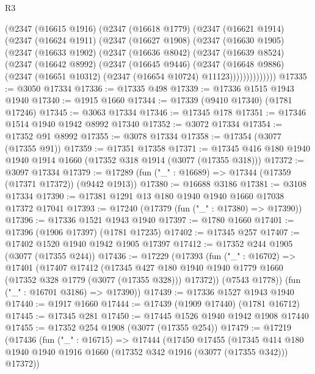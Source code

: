 \begin{lexlean}{R3}
\begin{coremodule}
    (@2347
      (@16615 @1916)
      (@2347
        (@16618 @1779)
        (@2347
          (@16621 @1914)
          (@2347
            (@16624 @1911)
            (@2347
              (@16627 @1908)
              (@2347
                (@16630 @1905)
                (@2347
                  (@16633 @1902)
                  (@2347
                    (@16636 @8042)
                    (@2347
                      (@16639 @8524)
                      (@2347
                        (@16642 @8992)
                        (@2347
                          (@16645 @9446)
                          (@2347
                            (@16648 @9886)
                            (@2347 (@16651 @10312) (@2347 (@16654 @10724) @11123))))))))))))))
@17335 := @3050 @17334
@17336 := @17335 @498
@17339 := @17336 @1515 @1943 @1940
@17340 := @1915 @1660
@17344 := @17339 (@9410 @17340) (@1781 @17246)
@17345 := @3063 @17334
@17346 := @17345 @178
@17351 := @17346 @1514 @1940 @1942 @8992 @17340
@17352 := @3072 @17334
@17354 := @17352 @91 @8992
@17355 := @3078 @17334
@17358 := @17354 (@3077 (@17355 @91))
@17359 := @17351 @17358
@17371 := @17345 @416 @180 @1940 @1940 @1914 @1660 (@17352 @318 @1914 (@3077 (@17355 @318)))
@17372 := @3097 @17334
@17379 := @17289 (fun ("_" : @16689) => @17344 (@17359 (@17371 @17372)) (@9442 @1913))
@17380 := @16688 @3186
@17381 := @3108 @17334
@17390 := @17381 @1291 @13 @180 @1940 @1940 @1660 @17038 @17372 @17041
@17393 := @17240 (@17379 (fun ("_" : @17380) => @17390))
@17396 := @17336 @1521 @1943 @1940
@17397 := @1780 @1660
@17401 := @17396 (@1906 @17397) (@1781 @17235)
@17402 := @17345 @257
@17407 := @17402 @1520 @1940 @1942 @1905 @17397
@17412 := @17352 @244 @1905 (@3077 (@17355 @244))
@17436 := @17229
    (@17393
      (fun ("_" : @16702) =>
      @17401
        (@17407
          @17412
          (@17345
            @427
            @180
            @1940
            @1940
            @1779
            @1660
            (@17352 @328 @1779 (@3077 (@17355 @328)))
            @17372))
        (@7543 @1778))
      (fun ("_" : @16701 @3186) => @17390))
@17439 := @17336 @1527 @1943 @1940
@17440 := @1917 @1660
@17444 := @17439 (@1909 @17440) (@1781 @16712)
@17445 := @17345 @281
@17450 := @17445 @1526 @1940 @1942 @1908 @17440
@17455 := @17352 @254 @1908 (@3077 (@17355 @254))
@17479 := @17219
    (@17436
      (fun ("_" : @16715) =>
      @17444
        (@17450
          @17455
          (@17345
            @414
            @180
            @1940
            @1940
            @1916
            @1660
            (@17352 @342 @1916 (@3077 (@17355 @342)))
            @17372))

\end{coremodule}
\end{lexlean}
